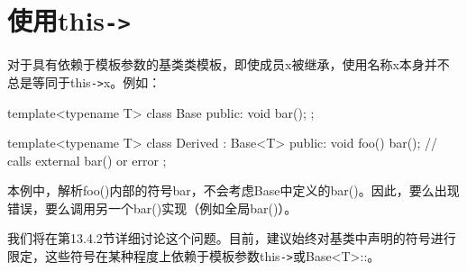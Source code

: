 \section{使用this\texttt{->}}
对于具有依赖于模板参数的基类类模板，即使成员x被继承，使用名称x本身并不总是等同于this\texttt{->}x。例如：

\begin{cpp}
template<typename T>
class Base {
public:
	void bar();
};

template<typename T>
class Derived : Base<T> {
public:
	void foo() {
		bar(); // calls external bar() or error
	}
};
\end{cpp}

本例中，解析foo()内部的符号bar，不会考虑Base中定义的bar()。因此，要么出现错误，要么调用另一个bar()实现（例如全局bar()）。

我们将在第13.4.2节详细讨论这个问题。目前，建议始终对基类中声明的符号进行限定，这些符号在某种程度上依赖于模板参数this\texttt{->}或Base<T>::。














































